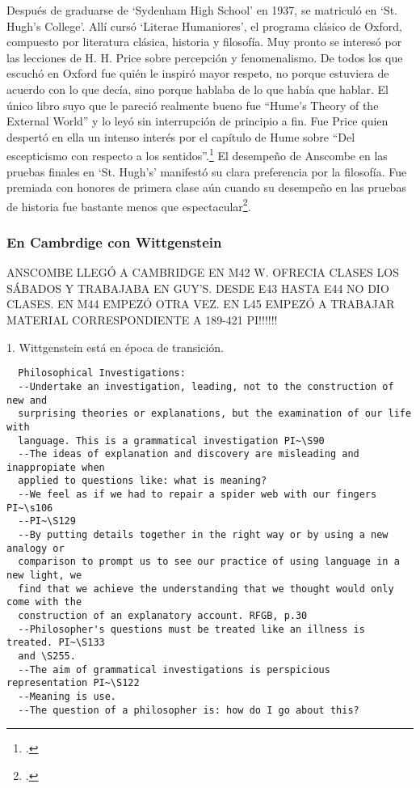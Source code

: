   Después de graduarse de `Sydenham High School' en 1937, se matriculó en `St.
  Hugh's College'. Allí cursó `Literae Humaniores', el programa clásico de Oxford,
  compuesto por literatura clásica, historia y filosofía. Muy pronto se interesó
  por las lecciones de H. H. Price sobre percepción y fenomenalismo. De todos los
  que escuchó en Oxford fue quién le inspiró mayor respeto, no porque estuviera de
  acuerdo con lo que decía, sino porque hablaba de lo que había que hablar. El
  único libro suyo que le pareció realmente bueno fue ``Hume's Theory of the
  External World'' y lo leyó sin interrupción de principio a
  fin. Fue Price quien despertó en ella un intenso interés por el capítulo de Hume
  sobre ``Del escepticismo con respecto a los sentidos''.\footcite[cf.~][p.~viii
  \S1]{M&PotM} El desempeño de Anscombe en las pruebas finales en `St. Hugh's'
  manifestó su clara preferencia por la filosofía. Fue premiada con honores de
  primera clase aún cuando su desempeño en las pruebas de historia fue bastante
  menos que espectacular\footcite[p.~3~\S1]{teichmann}.

  \subsubsection{En Cambrdige con Wittgenstein}
  ANSCOMBE LLEGÓ A CAMBRIDGE EN M42 W. OFRECIA CLASES LOS SÁBADOS Y TRABAJABA EN
  GUY'S. DESDE E43 HASTA E44 NO DIO CLASES. EN M44 EMPEZÓ OTRA VEZ. EN L45 EMPEZÓ
  A TRABAJAR MATERIAL CORRESPONDIENTE A 189-421 PI!!!!!!

  1. Wittgenstein está en época de transición.
  \begin{verbatim}
  Philosophical Investigations:
  --Undertake an investigation, leading, not to the construction of new and
  surprising theories or explanations, but the examination of our life with
  language. This is a grammatical investigation PI~\S90 
  --The ideas of explanation and discovery are misleading and inappropiate when
  applied to questions like: what is meaning?
  --We feel as if we had to repair a spider web with our fingers PI~\s106
  --PI~\S129
  --By putting details together in the right way or by using a new analogy or
  comparison to prompt us to see our practice of using language in a new light, we
  find that we achieve the understanding that we thought would only come with the
  construction of an explanatory account. RFGB, p.30
  --Philosopher's questions must be treated like an illness is treated. PI~\S133
  and \S255.
  --The aim of grammatical investigations is perspicious representation PI~\S122
  --Meaning is use.
  --The question of a philosopher is: how do I go about this?
  \end{verbatim}


